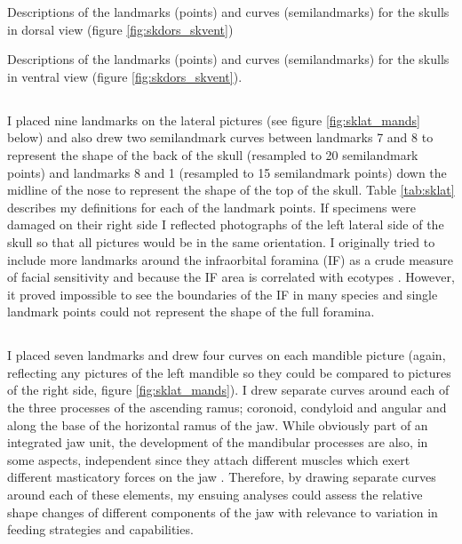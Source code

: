 
\begin{table}[h]
	\caption[Skulls: dorsal landmarks]
		{Descriptions of the landmarks (points) and curves (semilandmarks) for the skulls in dorsal view (figure
		\ref{fig:skdors_skvent})} 
	
	\label{tab:skdors}
\end{table}

\begin{table}[!htb] %
\caption[Skulls: ventral landmarks]
		{Descriptions of the landmarks (points) and curves (semilandmarks) for the skulls in ventral view (figure \ref{fig:skdors_skvent}).} 

\label{tab:skvent}
\end{table}
\newpage
\subsection{}
	I placed nine landmarks on the lateral pictures (see figure \ref{fig:sklat_mands} below) and also drew two semilandmark curves between landmarks 7 and 8 to represent the shape of the back of the skull (resampled to 20 semilandmark points) and landmarks 8 and 1 (resampled to 15 semilandmark points) down the midline of the nose to represent the shape of the top of the skull. Table \ref{tab:sklat} describes my definitions for each of the landmark points.
	If specimens were damaged on their right side I reflected photographs of the left lateral side of the skull so that all pictures would be in the same orientation.
	I originally tried to include more landmarks around the infraorbital foramina (IF) as a crude measure of facial sensitivity and because the IF area is correlated with ecotypes \citep{Crumpton2012}. However, it proved impossible to see the boundaries of the IF in many species and single landmark points could not represent the shape of the full foramina. 

\subsection{}
	I placed seven landmarks and drew four curves on each mandible picture (again, reflecting any pictures of the left mandible so they could be compared to pictures of the right side, figure \ref{fig:sklat_mands}). I drew separate curves around each of the three processes of the ascending ramus; coronoid, condyloid and angular and along the base of the horizontal ramus of the jaw. While obviously part of an integrated jaw unit, the development of the mandibular processes are also, in some aspects, independent since they attach different muscles which exert different masticatory forces on the jaw \citep{Barrow2008}. Therefore, by drawing separate curves around each of these elements, my ensuing analyses could assess the relative shape changes of different components of the jaw with relevance to variation in feeding strategies and capabilities.

